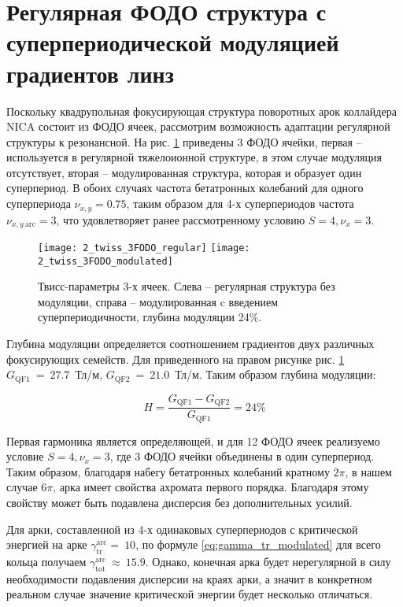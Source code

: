 	\section{Регулярная ФОДО структура с суперпериодической модуляцией градиентов линз}\label{sec:transition_variation/methods/FODO}

\par Поскольку квадрупольная фокусирующая структура поворотных арок коллайдера NICA состоит из ФОДО ячеек, рассмотрим возможность адаптации регулярной структуры к резонансной. На рис. \ref{fig:twiss_3FODO} приведены 3 ФОДО ячейки, первая – используется в регулярной тяжелоионной структуре, в этом случае модуляция отсутствует, вторая – модулированная структура,  которая и образует один суперпериод. В обоих случаях частота бетатронных колебаний для одного суперпериода $\nu_{x,y}=0.75$, таким образом для 4-х суперпериодов частота $\nu_{x,y\ \text{arc}}=3$, что удовлетворяет ранее рассмотренному условию $S=4, \nu_x=3$.

\begin{figure}[h!]
	\texttt{[image: 2\_twiss\_3FODO\_regular]}
	\texttt{[image: 2\_twiss\_3FODO\_modulated]}
	\caption{Твисс-параметры 3-х ячеек. Слева – регулярная структура без модуляции, справа – модулированная c введением суперпериодичности, глубина модуляции 24\%.}
	\label{fig:twiss_3FODO}
\end{figure}

\noindent Глубина модуляции определяется соотношением градиентов двух различных фокусирующих семейств. Для приведенного на правом рисунке рис. \ref{fig:twiss_3FODO} $G_{\textrm{QF1}}~=~27.7$~Тл/м, $G_{\textrm{QF2}}~=~21.0$~Тл/м. Таким образом глубина модуляции:

\begin{equation}
H=\frac{G_{\textrm{QF1}}-G_{\textrm{QF2}}}{G_{\textrm{QF1}}}=24\%
\label {eq:modulated_coeff}
\end{equation}

\noindent Первая гармоника является определяющей, и для 12 ФОДО ячеек реализуемо условие $S=4, \nu_x=3$, где 3 ФОДО ячейки объединены в один суперпериод. Таким образом, благодаря набегу бетатронных колебаний кратному $2\pi$, в нашем случае $6\pi$, арка имеет свойства ахромата первого порядка. Благодаря этому свойству может быть подавлена дисперсия без дополнительных усилий.

\noindent Для арки, составленной из 4-х одинаковых суперпериодов с критической энергией на арке $\gamma_{\text{tr}}^{\text{arc}}=\ 10$, по формуле \ref{eq:gamma_tr_modulated} для всего кольца получаем $\gamma_{\text{tot}}^{\text{arc}}\ \approx\ 15.9$. Однако, конечная арка будет нерегулярной в силу необходимости подавления дисперсии на краях арки, а значит в конкретном реальном случае значение критической энергии будет несколько отличаться.

